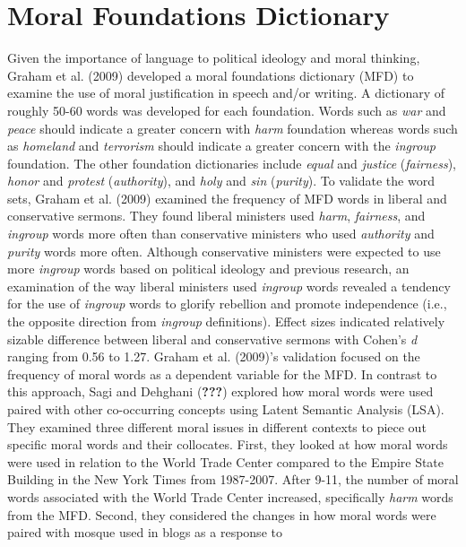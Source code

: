 \documentclass[english,man]{apa6}
\newcounter{author}
\theoremstyle{definition}
\theoremstyle{definition}
\theoremstyle{definition}
\theoremstyle{remark}
\begin{document}
\section{Moral Foundations
Dictionary}\label{moral-foundations-dictionary}

Given the importance of language to political ideology and moral
thinking, Graham et al. (2009) developed a moral foundations dictionary
(MFD) to examine the use of moral justification in speech and/or
writing. A dictionary of roughly 50-60 words was developed for each
foundation. Words such as \emph{war} and \emph{peace} should indicate a
greater concern with \emph{harm} foundation whereas words such as
\emph{homeland} and \emph{terrorism} should indicate a greater concern
with the \emph{ingroup} foundation. The other foundation dictionaries
include \emph{equal} and \emph{justice} (\emph{fairness}), \emph{honor}
and \emph{protest} (\emph{authority}), and \emph{holy} and \emph{sin}
(\emph{purity}). To validate the word sets, Graham et al. (2009)
examined the frequency of MFD words in liberal and conservative sermons.
They found liberal ministers used \emph{harm}, \emph{fairness}, and
\emph{ingroup} words more often than conservative ministers who used
\emph{authority} and \emph{purity} words more often. Although
conservative ministers were expected to use more \emph{ingroup} words
based on political ideology and previous research, an examination of the
way liberal ministers used \emph{ingroup} words revealed a tendency for
the use of \emph{ingroup} words to glorify rebellion and promote
independence (i.e., the opposite direction from \emph{ingroup}
definitions). Effect sizes indicated relatively sizable difference
between liberal and conservative sermons with Cohen's \emph{d} ranging
from 0.56 to 1.27. Graham et al. (2009)'s validation focused on the
frequency of moral words as a dependent variable for the MFD. In
contrast to this approach, Sagi and Dehghani ({\textbf{???}}) explored
how moral words were used paired with other co-occurring concepts using
Latent Semantic Analysis (LSA). They examined three different moral
issues in different contexts to piece out specific moral words and their
collocates. First, they looked at how moral words were used in relation
to the World Trade Center compared to the Empire State Building in the
New York Times from 1987-2007. After 9-11, the number of moral words
associated with the World Trade Center increased, specifically
\emph{harm} words from the MFD. Second, they considered the changes in
how moral words were paired with mosque used in blogs as a response to
\end{document}
